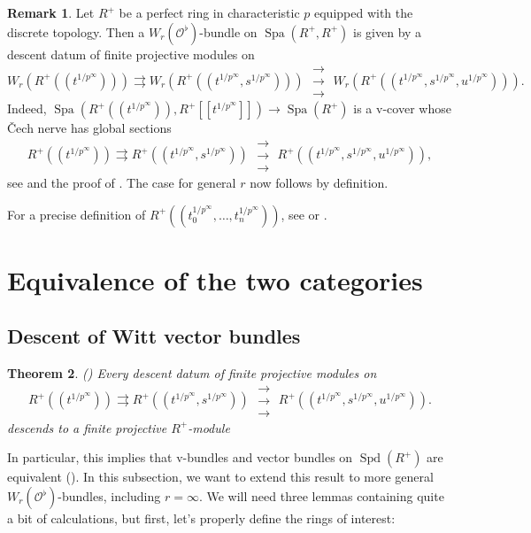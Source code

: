 \documentclass[10pt,twoside]{article}
\numberwithin{equation}{section}
\theoremstyle{plain}
\newtheorem{mythm}{Theorem}[section]
\theoremstyle{definition}
\newtheorem{myrem}[mythm]{Remark}
\DeclareMathOperator{\Spa}{Spa}
\DeclareMathOperator{\Spd}{Spd}
\newcommand{\MCO}{\mathcal{O}}
\newcommand{\pRoots}{{1/p^\infty}}
\newcommand{\rrrarrows}{\;\substack{\rightarrow\\[-1em] \rightarrow \\[-1em] \rightarrow}\;}
\begin{document}
\begin{myrem}\label{WBundleSpecialCase}
    Let \(R^+\) be a perfect ring in characteristic \(p\) equipped with the discrete topology. Then a \(W_r(\MCO^\flat)\)-bundle on \(\Spa(R^+,R^+)\) is given by a descent datum of finite projective modules on
    \[ W_r(R^+((t^{1/p^\infty}))) \rightrightarrows W_r(R^+((t^{1/p^\infty},s^{1/p^\infty})))  \rrrarrows W_r(R^+((t^{1/p^\infty},s^{1/p^\infty},u^{1/p^\infty}))).\]
    Indeed, \(\Spa(R^+((t^{\pRoots})),R^+[[t^{\pRoots}]])\to \Spa(R^+)\) is a v-cover whose \v{C}ech nerve has global sections
    \[R^+((t^{1/p^\infty})) \rightrightarrows R^+((t^{1/p^\infty},s^{1/p^\infty})) \rrrarrows R^+((t^{1/p^\infty},s^{1/p^\infty},u^{1/p^\infty})),\]
    see \cite[Lemma 5.2]{Kim} and the proof of \cite[Corollary 5.3]{Kim}. The case for general \(r\) now follows by definition.
\end{myrem}

For a precise definition of \(R^+((t_0^{1/p^\infty},\dots, t_n^{1/p^\infty}))\), see \cite[Definition 2.4]{Kim} or .

\section{Equivalence of the two categories}
\subsection{Descent of Witt vector bundles}

\begin{mythm}\label{Kim} (\cite[Theorem 4.9]{Kim})
    Every descent datum of finite projective modules on
    \[R^+((t^{1/p^\infty})) \rightrightarrows R^+((t^{1/p^\infty},s^{1/p^\infty}))  \rrrarrows R^+((t^{1/p^\infty},s^{1/p^\infty},u^{1/p^\infty})).\]
    descends to a finite projective \(R^+\)-module
\end{mythm}
In particular, this implies that v-bundles and vector bundles on \(\Spd(R^+)\) are equivalent (\cite[Corollary 5.3]{Kim}).
In this subsection, we want to extend this result to more general \(W_r(\MCO^\flat)\)-bundles, including \(r=\infty\). We will need three lemmas containing quite a bit of calculations, but first, let's properly define the rings of interest:
\end{document}
